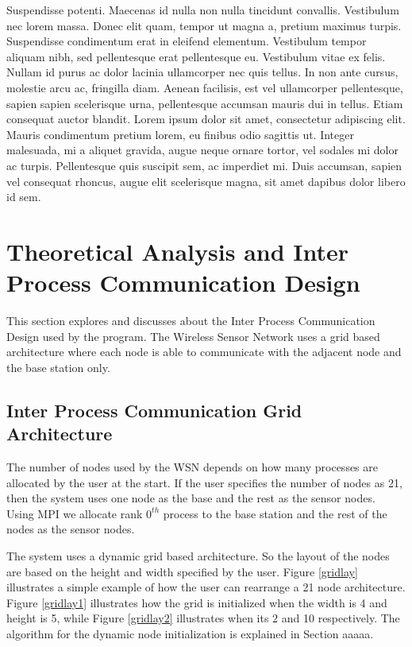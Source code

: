 \documentclass[conference]{IEEEtran}
\begin{document}
	Suspendisse potenti. Maecenas id nulla non nulla tincidunt convallis. Vestibulum nec lorem massa. Donec elit quam, tempor ut magna a, pretium maximus turpis. Suspendisse condimentum erat in eleifend elementum. Vestibulum tempor aliquam nibh, sed pellentesque erat pellentesque eu. Vestibulum vitae ex felis. Nullam id purus ac dolor lacinia ullamcorper nec quis tellus. In non ante cursus, molestie arcu ac, fringilla diam. Aenean facilisis, est vel ullamcorper pellentesque, sapien sapien scelerisque urna, pellentesque accumsan mauris dui in tellus. Etiam consequat auctor blandit. Lorem ipsum dolor sit amet, consectetur adipiscing elit. Mauris condimentum pretium lorem, eu finibus odio sagittis ut. Integer malesuada, mi a aliquet gravida, augue neque ornare tortor, vel sodales mi dolor ac turpis. Pellentesque quis suscipit sem, ac imperdiet mi. Duis accumsan, sapien vel consequat rhoncus, augue elit scelerisque magna, sit amet dapibus dolor libero id sem.


	\section{Theoretical  Analysis and Inter Process Communication Design}
	
	This section explores and discusses about the Inter Process Communication Design used by the program. The Wireless Sensor Network uses a grid based architecture where each node is able to communicate with the adjacent node and the base station only.
	
	
	\subsection{ Inter Process Communication Grid Architecture}\label{IPCArc}
	
	The number of nodes used by the WSN  depends on how many processes are allocated by the user at the start. If the user specifies the number of nodes as 21, then the system uses one node as the base and the rest as the sensor nodes. Using MPI we allocate rank $0^{th}$ process to the base station and the rest of the nodes as the sensor nodes. 
	
	The system uses a dynamic grid based architecture. So the layout of the nodes are based on the height and width specified by the user. Figure \ref{gridlay}  illustrates a simple example of how the user can rearrange a 21 node architecture. Figure \ref{gridlay1} illustrates how the grid is initialized when the width is 4 and height is 5, while Figure \ref{gridlay2} illustrates when its 2 and 10 respectively. The algorithm for the dynamic node initialization is explained in Section aaaaa. 
	
\end{document}
